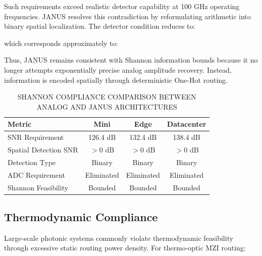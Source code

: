 \documentclass[journal]{IEEEtran}
\begin{document}
\begin{center}
\end{center}

Such requirements exceed realistic detector capability at 100 GHz operating frequencies. JANUS resolves this contradiction by reformulating arithmetic into binary spatial localization. The detector condition reduces to:

\begin{center}
\end{center}

which corresponds approximately to:

\begin{center}
\end{center}

Thus, JANUS remains consistent with Shannon information bounds because it no longer attempts exponentially precise analog amplitude recovery. Instead, information is encoded spatially through deterministic One-Hot routing.

\begin{table}[htbp]
\centering
\small
\setlength{\tabcolsep}{3pt}
\caption{SHANNON COMPLIANCE COMPARISON BETWEEN ANALOG AND JANUS ARCHITECTURES}
\label{tab:table19}
\begin{tabular}{lccc}
\toprule
Metric & Mini & Edge & Datacenter \\
\midrule
SNR Requirement & 126.4 dB & 132.4 dB & 138.4 dB \\
Spatial Detection SNR & $> 0\text{ dB}$ & $> 0\text{ dB}$ & $> 0\text{ dB}$ \\
Detection Type & Binary & Binary & Binary \\
ADC Requirement & Eliminated & Eliminated & Eliminated \\
Shannon Feasibility & Bounded & Bounded & Bounded \\
\bottomrule
\end{tabular}
\end{table}

\subsection{\textbf{Thermodynamic Compliance}}

Large-scale photonic systems commonly violate thermodynamic feasibility through excessive static routing power density. For thermo-optic MZI routing:

\begin{center}
\end{center}
\end{document}
